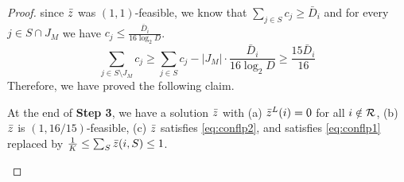 \documentclass{article}[11pt]
\newcommand{\barD}{\bar{D}}
\begin{document}
\begin{proof}
	since $\bar z$ was $(1,1)$-feasible, we know that $\sum_{j\in S} c_j \geq \barD_i$ and for every $j\in S\cap J_M$ we have $c_j \leq \frac{\barD_i}{16\log_2 D}$.
	\[
	\sum_{j\in S\setminus J_M} c_j \geq  \sum_{j\in S} c_j - |J_M|\cdot \frac{\barD_i}{16\log_2 D} \geq \frac{15\barD_i}{16}
	\]
	Therefore, we have proved the following claim.
	\begin{claim}\label{clm:007}
		At the end of {\bf  Step 3}, we have a solution $\bar z$ with (a) $\bar z^L(i) = 0$ for all $i\notin {\cal R}$, (b) $\bar z$ is $(1,16/15)$-feasible,
		(c) $\bar z$ satisfies \eqref{eq:conflp2}, and satisfies \eqref{eq:conflp1} replaced by $\frac{1}{K} \leq \sum_S \bar z(i,S) \leq 1$.
	\end{claim}
	\smallskip
	

\end{proof}
\end{document}
